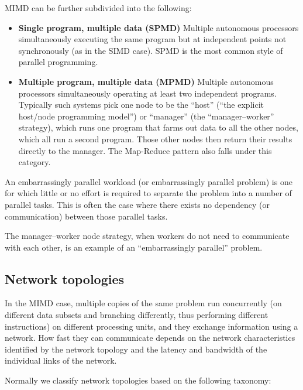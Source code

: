 \documentclass[justified, sixbynine]{tufte-book}
\theoremstyle{plain}%
\newtheorem * {corollary}{Corollary}
\theoremstyle{definition}
\theoremstyle{remark}
\newtheorem * {remark}{Remark}
\newtheorem * {note}{Note}
\begin{document}
\begin{fullwidth}

MIMD can be further subdivided into the following:
\begin{itemize}

\item {\bf Single program, multiple data (SPMD)}
Multiple autonomous processors simultaneously executing the same program but at independent points not synchronously (as in the SIMD case). SPMD is the most common style of parallel programming.

\item {\bf Multiple program, multiple data (MPMD)}
Multiple autonomous processors simultaneously operating at least two independent programs. Typically such systems pick one node to be the ``host'' (``the explicit host/node programming model'') or ``manager'' (the ``manager--worker'' strategy), which runs one program that farms out data to all the other nodes, which all run a second program. Those other nodes then return their results directly to the manager. The Map-Reduce pattern also falls under this category.
\end{itemize}

An embarrassingly parallel workload (or embarrassingly parallel problem) is one for which little or no effort is required to separate the problem into a number of parallel tasks. This is often the case where there exists no dependency (or communication) between those parallel tasks.

The manager--worker node strategy, when workers do not need to communicate with each other, is an example of an ``embarrassingly parallel'' problem.


\goodbreak\subsection{Network topologies}


In the MIMD case, multiple copies of the same problem run concurrently (on different data subsets and branching differently, thus performing different instructions) on different processing units, and they exchange information using a network. How fast they can communicate depends on the network characteristics identified by the network topology and the latency and bandwidth of the individual links of the network.

Normally we classify network topologies based on the following taxonomy:


\end{fullwidth}
\end{document}
